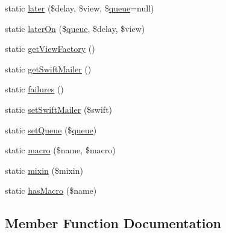 \begin{DoxyCompactItemize}
\item 
static \mbox{\hyperlink{class_illuminate_1_1_support_1_1_facades_1_1_mail_a2972059488d1ba83e8acc56cabc269f0}{later}} (\$delay, \$view, \$\mbox{\hyperlink{class_illuminate_1_1_support_1_1_facades_1_1_mail_a478836272e2433d16e0b02f850e146ac}{queue}}=null)
\item 
static \mbox{\hyperlink{class_illuminate_1_1_support_1_1_facades_1_1_mail_a1247d0e81905df819e8e3e015917128c}{later\+On}} (\$\mbox{\hyperlink{class_illuminate_1_1_support_1_1_facades_1_1_mail_a478836272e2433d16e0b02f850e146ac}{queue}}, \$delay, \$view)
\item 
static \mbox{\hyperlink{class_illuminate_1_1_support_1_1_facades_1_1_mail_a4e55d12d552d180f8c4684c31debed90}{get\+View\+Factory}} ()
\item 
static \mbox{\hyperlink{class_illuminate_1_1_support_1_1_facades_1_1_mail_a1e36e3a729e3286f8d5e531c74685eb6}{get\+Swift\+Mailer}} ()
\item 
static \mbox{\hyperlink{class_illuminate_1_1_support_1_1_facades_1_1_mail_abf36e9099d5512f43e32522e871d2ecd}{failures}} ()
\item 
static \mbox{\hyperlink{class_illuminate_1_1_support_1_1_facades_1_1_mail_a3350fe2ac5cd333f571c105dcf372dcb}{set\+Swift\+Mailer}} (\$swift)
\item 
static \mbox{\hyperlink{class_illuminate_1_1_support_1_1_facades_1_1_mail_a8db31881b6edc8d158b9db8247daac96}{set\+Queue}} (\$\mbox{\hyperlink{class_illuminate_1_1_support_1_1_facades_1_1_mail_a478836272e2433d16e0b02f850e146ac}{queue}})
\item 
static \mbox{\hyperlink{class_illuminate_1_1_support_1_1_facades_1_1_mail_ab40a7de8f2f3816b6dbdfa438a6775b4}{macro}} (\$name, \$macro)
\item 
static \mbox{\hyperlink{class_illuminate_1_1_support_1_1_facades_1_1_mail_a80284732d22b8657031ebc047008c803}{mixin}} (\$mixin)
\item 
static \mbox{\hyperlink{class_illuminate_1_1_support_1_1_facades_1_1_mail_ab5d2289e0b9bcae425730e688cdb4041}{has\+Macro}} (\$name)
\end{DoxyCompactItemize}


\subsection{Member Function Documentation}
\mbox{\label{class_illuminate_1_1_support_1_1_facades_1_1_mail_a24a500e68752fd86d4d2ad057431f3d7}} 
